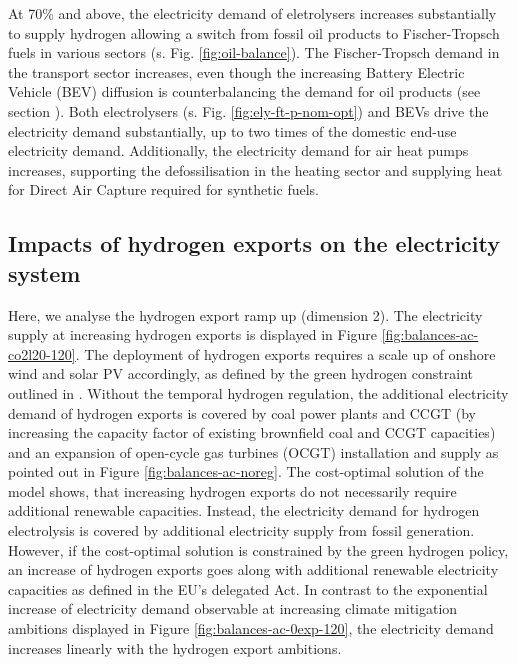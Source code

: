 \documentclass[5p,numafflabel]{elsarticle}
\begin{document}
At 70\% and above, the electricity demand of eletrolysers increases substantially to supply hydrogen allowing a switch from fossil oil products to Fischer-Tropsch fuels in various sectors (s. Fig. \ref{fig:oil-balance}). 
The Fischer-Tropsch demand in the transport sector increases, even though the increasing Battery Electric Vehicle (BEV) diffusion is counterbalancing the demand for oil products (see  section ). 
Both electrolysers (s. Fig. \ref{fig:ely-ft-p-nom-opt}) and BEVs drive the electricity demand substantially, up to two times of the domestic end-use electricity demand. 
Additionally, the electricity demand for air heat pumps increases, supporting the defossilisation in the heating sector and supplying heat for Direct Air Capture required for synthetic fuels.


\subsection*{Impacts of hydrogen exports on the electricity system}
\label{subsec:increase_h2}

Here, we analyse the hydrogen export ramp up (dimension 2). The electricity supply at increasing hydrogen exports is displayed in Figure \ref{fig:balances-ac-co2l20-120}. The deployment of hydrogen exports requires a scale up of onshore wind and solar PV accordingly, as defined by the green hydrogen constraint outlined in .
Without the temporal hydrogen regulation, the additional electricity demand of hydrogen exports is covered by coal power plants and CCGT (by increasing the capacity factor of existing brownfield coal and CCGT capacities) and an expansion of open-cycle gas turbines (OCGT) installation and supply as pointed out in Figure \ref{fig:balances-ac-noreg}.
The cost-optimal solution of the model shows, that increasing hydrogen exports do not necessarily require additional renewable capacities. Instead, the electricity demand for hydrogen electrolysis is covered by additional electricity supply from fossil generation. However, if the cost-optimal solution is constrained by the green hydrogen policy, an increase of hydrogen exports goes along with additional renewable electricity capacities as defined in the EU's delegated Act.
In contrast to the exponential increase of electricity demand observable at increasing climate mitigation ambitions displayed in Figure \ref{fig:balances-ac-0exp-120}, the electricity demand increases linearly with the hydrogen export ambitions.
\end{document}
